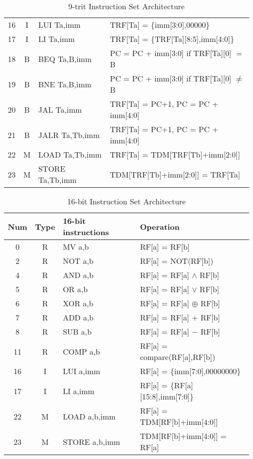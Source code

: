 \documentclass[12pt]{article}
\begin{document}
\begin{table}[h]
\begin{tabular}{|c|c|l|l|}
    16 & I & LUI Ta,imm & TRF[Ta] = \{imm[3:0],00000\} \\
    17 & I & LI Ta,imm & TRF[Ta] = \{TRF[Ta][8:5],imm[4:0]\} \\
    18 & B & BEQ Ta,B,imm & PC = PC + imm[3:0] if TRF[Ta][0] $=$ B \\
    19 & B & BNE Ta,B,imm & PC = PC + imm[3:0] if TRF[Ta][0] $\neq$ B \\
    20 & B & JAL Ta,imm & TRF[Ta] = PC+1, PC = PC + imm[4:0] \\
    21 & B & JALR Ta,Tb,imm & TRF[Ta] = PC+1, PC = PC + imm[4:0] \\
    22 & M & LOAD Ta,Tb,imm & TRF[Ta] = TDM[TRF[Tb]+imm[2:0]] \\
    23 & M & STORE Ta,Tb,imm & TDM[TRF[Tb]+imm[2:0]] = TRF[Ta] \\
    \hline
    \end{tabular}
    \caption{9-trit Instruction Set Architecture}
\end{table}

\begin{table}[h]
    \begin{tabular}{|c|c|l|l|}
    \hline
    Num & Type & 16-bit instructions & Operation \\
    \hline
    0 & R & MV a,b & RF[a] = RF[b] \\
    2 & R & NOT a,b & RF[a] = NOT(RF[b]) \\
    4 & R & AND a,b & RF[a] = RF[a] $\wedge$ RF[b] \\
    5 & R & OR a,b & RF[a] = RF[a] $\vee$ RF[b] \\
    6 & R & XOR a,b & RF[a] = RF[a] $\oplus$ RF[b] \\
    7 & R & ADD a,b & RF[a] = RF[a] $+$ RF[b] \\
    8 & R & SUB a,b & RF[a] = RF[a] $-$ RF[b] \\
    11 & R & COMP a,b & RF[a] = compare(RF[a],RF[b]) \\
    16 & I & LUI a,imm & RF[a] = \{imm[7:0],00000000\} \\
    17 & I & LI a,imm & RF[a] = \{RF[a][15:8],imm[7:0]\} \\
    22 & M & LOAD a,b,imm & RF[a] = TDM[RF[b]+imm[4:0]] \\
    23 & M & STORE a,b,imm & TDM[RF[b]+imm[4:0]] = RF[a] \\
    \hline
    \end{tabular}
    \caption{16-bit Instruction Set Architecture}
\end{table}
\end{document}
